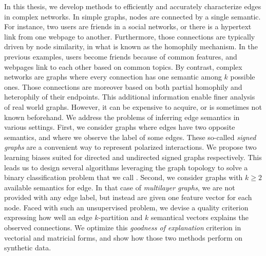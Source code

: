 In this thesis, we develop methods to efficiently and accurately characterize edges in complex
networks. In simple graphs, nodes are connected by a single semantic. For instance, two users are
friends in a social networks, or there is a hypertext link from one webpage to another. Furthermore,
those connections are typically driven by node similarity, in what is known as the homophily
mechanism. In the previous examples, users become friends because of common features, and webpages
link to each other based on common topics. By contrast, complex networks are graphs where every
connection has one semantic among $k$ possible ones. Those connections are moreover based on both
partial homophily and heterophily of their endpoints. This additional information enable finer
analysis of real world graphs. However, it can be expensive to acquire, or is sometimes not known
beforehand. We address the problems of inferring edge semantics in various settings. First, we
consider graphs where edges have two opposite semantics, and where we observe the label of some
edges. These so-called \emph{signed graphs} are a convenient way to represent polarized
interactions. We propose two learning biases suited for directed and undirected signed graphs
respectively. This leads us to design several algorithms leveraging the graph topology to solve a
binary classification problem that we call \esp{}. Second, we consider graphs with $k \geq 2$
available semantics for edge. In that case of \emph{multilayer graphs}, we are not provided with any
edge label, but instead are given one feature vector for each node. Faced with such an unsupervised
\ecp{} problem, we devise a quality criterion expressing how well an edge $k$-partition and $k$
semantical vectors explains the observed connections. We optimize this \emph{goodness of
explanation} criterion in vectorial and matricial forms, and show how those two methods perform on
synthetic data.

